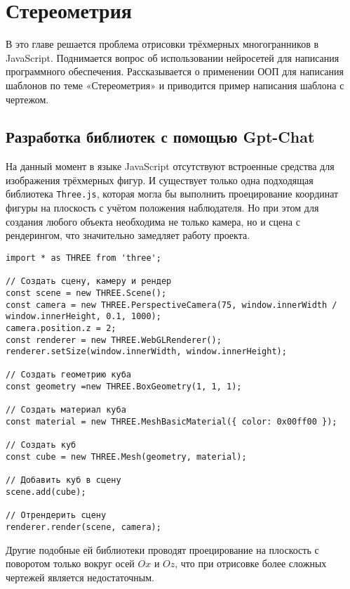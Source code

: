 \section{Стереометрия}\label{2sect}
В это главе решается проблема отрисовки трёхмерных многогранников в JavaScript. Поднимается вопрос об использовании нейросетей для написания программного обеспечения. Рассказывается о применении ООП для написания шаблонов по теме «Стереометрия» и приводится пример написания шаблона с чертежом. 

\subsection{Разработка библиотек с помощью Gpt-Chat}

На данный момент в языке JavaScript отсутствуют встроенные средства для изображения трёхмерных фигур. И существует только одна подходящая библиотека \texttt{Three.js}, которая могла бы выполнить проецирование координат фигуры на плоскость с учётом положения наблюдателя. Но при этом для создания любого объекта необходима не только камера, но и сцена с рендерингом, что значительно замедляет работу проекта.

\begin{lstlisting}[caption={Код, необходыимый для отрисовки куба}]
import * as THREE from 'three';

// Создать сцену, камеру и рендер
const scene = new THREE.Scene();
const camera = new THREE.PerspectiveCamera(75, window.innerWidth / window.innerHeight, 0.1, 1000);
camera.position.z = 2;
const renderer = new THREE.WebGLRenderer();
renderer.setSize(window.innerWidth, window.innerHeight);

// Создать геометрию куба
const geometry =new THREE.BoxGeometry(1, 1, 1);

// Создать материал куба
const material = new THREE.MeshBasicMaterial({ color: 0x00ff00 });

// Создать куб
const cube = new THREE.Mesh(geometry, material);

// Добавить куб в сцену
scene.add(cube);

// Отрендерить сцену
renderer.render(scene, camera);

\end{lstlisting}


Другие подобные ей библиотеки проводят проецирование на плоскость с поворотом только вокруг осей $Ox$ и $Oz$, что при отрисовке более сложных чертежей является недостаточным.

